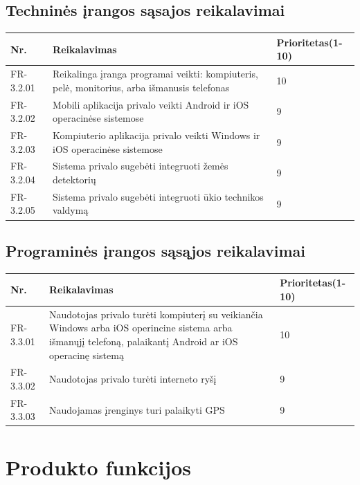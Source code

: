 \documentclass[oneside]{VUMIFPSkursinis}
\begin{document}
\subsection{Techninės įrangos sąsajos reikalavimai}
\begin{table}[htbp]
	\begin{tabularx}{1\textwidth}{ |P{2.5cm}|X|P{3cm }| }  \hline
		Nr. & Reikalavimas & Prioritetas(1-10) \\ \hline
		FR-3.2.01 & Reikalinga įranga programai veikti: kompiuteris, pelė, monitorius, arba išmanusis telefonas & 10 \\ \hline
		FR-3.2.02 & Mobili aplikacija privalo veikti Android ir iOS operacinėse sistemose & 9 \\ \hline
		FR-3.2.03 & Kompiuterio aplikacija privalo veikti Windows ir iOS operacinėse sistemose & 9 \\ \hline
		FR-3.2.04 & Sistema privalo sugebėti integruoti žemės detektorių & 9 \\ \hline
		FR-3.2.05 & Sistema privalo sugebėti integruoti ūkio technikos valdymą & 9 \\ \hline
	\end{tabularx}
\end{table}
\subsection{Programinės įrangos sąsąjos reikalavimai}
\begin{table}[htbp]
	\begin{tabularx}{1\textwidth}{ |P{2.5cm}|X|P{3cm }| }  \hline
		Nr. & Reikalavimas & Prioritetas(1-10) \\ \hline
		FR-3.3.01 & Naudotojas privalo turėti kompiuterį su veikiančia Windows arba iOS operincine sistema arba išmanųjį telefoną, palaikantį Android ar iOS operacinę sistemą & 10 \\ \hline
		FR-3.3.02 & Naudotojas privalo turėti interneto ryšį & 9 \\ \hline
		FR-3.3.03 & Naudojamas įrenginys turi palaikyti GPS & 9 \\ \hline
	\end{tabularx}
\end{table}

\section{Produkto funkcijos}
\end{document}
